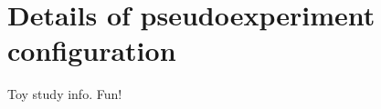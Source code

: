 \chapter{{\bf Details of pseudoexperiment configuration}}
\label{sec:appendix3}
Toy study info. Fun!
